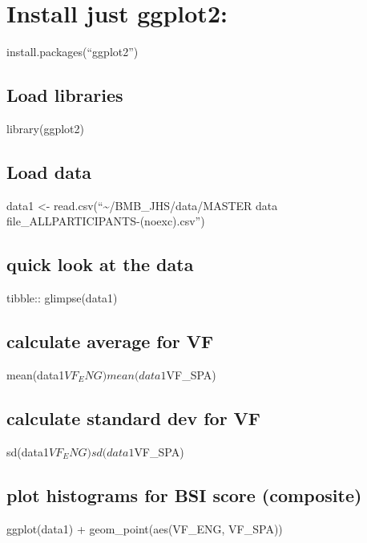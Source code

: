\documentclass[
]{article}
\author{}
\date{\vspace{-2.5em}}
\begin{document}
\hypertarget{install-just-ggplot2}{%
\section{Install just ggplot2:}\label{install-just-ggplot2}}

install.packages(``ggplot2'')

\hypertarget{load-libraries}{%
\subsection{Load libraries}\label{load-libraries}}

library(ggplot2)

\hypertarget{load-data}{%
\subsection{Load data}\label{load-data}}

data1 \textless- read.csv(``\textasciitilde/BMB\_JHS/data/MASTER data
file\_ALLPARTICIPANTS-(noexc).csv'')

\hypertarget{quick-look-at-the-data}{%
\subsection{quick look at the data}\label{quick-look-at-the-data}}

tibble:: glimpse(data1)

\hypertarget{calculate-average-for-vf}{%
\subsection{calculate average for VF}\label{calculate-average-for-vf}}

mean(data1\(VF_ENG) mean(data1\)VF\_SPA)

\hypertarget{calculate-standard-dev-for-vf}{%
\subsection{calculate standard dev for
VF}\label{calculate-standard-dev-for-vf}}

sd(data1\(VF_ENG) sd(data1\)VF\_SPA)

\hypertarget{plot-histograms-for-bsi-score-composite}{%
\subsection{plot histograms for BSI score
(composite)}\label{plot-histograms-for-bsi-score-composite}}

ggplot(data1) + geom\_point(aes(VF\_ENG, VF\_SPA))
\end{document}
